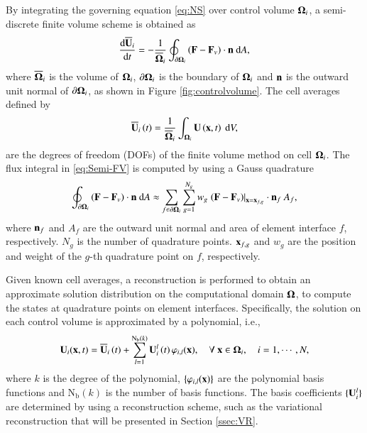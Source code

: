 By integrating the governing equation \eqref{eq:NS} over control volume $\mathbf{\Omega}_i$, a semi-discrete finite volume scheme is obtained as
\begin{equation}
    \label{eq:Semi-FV}
    \dfrac{ \dd\overline{\mathbf{U}}_i }{\dd t} = -\dfrac{1}{\overline{\mathbf{\Omega}}_i} \oint_{\partial \mathbf{\Omega}_i} \left(\mathbf{F} - \mathbf{F}_v \right) \cdot \mathbf{n} \ \dd A,
\end{equation}
where $\overline{\mathbf{\Omega}}_i$ is the volume of $\mathbf{\Omega}_i$, $\partial \mathbf{\Omega}_i$ is the boundary of $\mathbf{\Omega}_i$ and $\mathbf{n}$ is the outward unit normal of $\partial \mathbf{\Omega}_i$, as shown in Figure \ref{fig:controlvolume}. The cell averages defined by
\begin{equation}
    \label{eq:FVMean}
    \overline{\mathbf{U}}_i \left(t\right)= \frac{1}{\overline{\mathbf{\Omega}}_i}\int_{\mathbf{\Omega}_i}\mathbf{U} \left(\mathbf{x},t\right)\ \dd V,
\end{equation}
are the degrees of freedom (DOFs) of the finite volume method on cell $\mathbf{\Omega}_i$.
The flux integral in \eqref{eq:Semi-FV} is computed by using a Gauss quadrature
\begin{equation}
    \label{eq:Flux-Integral}
    \oint_{\partial \mathbf{\Omega}_i} \left(\mathbf{F} - \mathbf{F}_v \right) \cdot \mathbf{n} \ \dd A \approx \sum_{f \in \partial \mathbf{\Omega}_i} \sum_{g=1}^{N_g} w_g \left. \left(\mathbf{F} - \mathbf{F}_v \right)\right|_{\mathbf{x}=\mathbf{x}_{f,g}} \cdot \mathbf{n}_f \ A_f,
\end{equation}
where $\mathbf{n}_f$ and $A_f$ are the outward unit normal and area of element interface $f$, respectively. $N_g$ is the number of quadrature points. $\mathbf{x}_{f,g}$ and $w_g$ are the position and weight of the $g$-th quadrature point on $f$, respectively.

Given known cell averages, a reconstruction is performed to obtain an approximate solution distribution on the computational domain $\mathbf{\Omega}$, to compute the states at quadrature points on element interfaces. Specifically, the solution on each control volume is approximated by a polynomial, i.e.,
\begin{equation}
    \label{eq:FVRec}
    \mathbf{U}_i(\mathbf{x},t) = \overline{\mathbf{U}}_i \left(t\right) + \sum_{l=1}^{\mathrm{N_b}(k)}{\mathbf{U}_i^l \left(t\right) \varphi_{i,l}(\mathbf{x}) }, \quad \forall \ \mathbf{x} \in \mathbf{\Omega}_i, \quad i=1, \cdots, N,
\end{equation}
where $k$ is the degree of the polynomial, $\{\varphi_{i,l}(\mathbf{x})\}$ are the polynomial basis functions and $\mathrm{N_b}(k)$ is the number of basis functions. The basis coefficients $\{\mathbf{U}^l_i\}$ are determined by using a reconstruction scheme, such as the variational reconstruction \cite{wang2017compact_VR} that will be presented in Section \ref{ssec:VR}.


